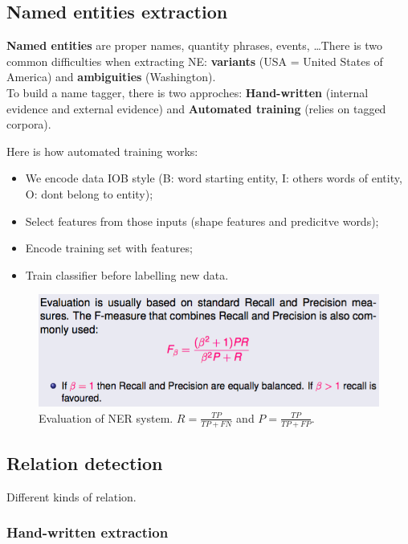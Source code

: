 
\subsection{Named entities extraction}

\textbf{Named entities} are proper names, quantity phrases, events, \dots There is two common difficulties when extracting NE: \textbf{variants} (USA = United States of America) and \textbf{ambiguities} (Washington).\\ To build a name tagger, there is two approches: \textbf{Hand-written} (internal evidence and external evidence) and \textbf{Automated training} (relies on tagged corpora).

Here is how automated training works:
\begin{itemize}
	\item We encode data IOB style (B: word starting entity, I: others words of entity, O: dont belong to entity);
	\item Select features from those inputs (shape features and predicitve words);
	\item Encode training set with features;
	\item Train classifier before labelling new data.
\end{itemize}

\begin{figure}[htp]
	\centering
	\includegraphics[scale=0.5]{images/69_eval.png}
 	\caption{Evaluation of NER system. $R = \frac{TP}{TP + FN}$ and $P = \frac{TP}{TP + FP}$.}
\end{figure}

\subsection{Relation detection}

Different kinds of relation.

\subsubsection{Hand-written extraction}

